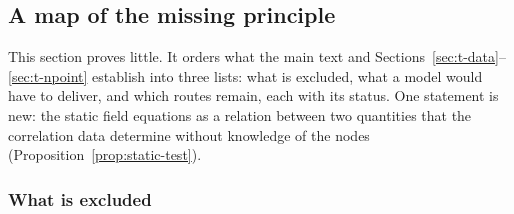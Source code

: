 \documentclass[11pt,a4paper]{article}
\theoremstyle{stmt}
\theoremstyle{defn}
\theoremstyle{rmk}
\numberwithin{equation}{section}
\begin{document}
{\subsection{A map of the missing principle}\label{sec:t-principle}

This section proves little. It orders what the main text and Sections~\ref{sec:t-data}--\ref{sec:t-npoint} establish into three lists: what is excluded, what a model would have to deliver, and which routes remain, each with its status. One statement is new: the static field equations as a relation between two quantities that the correlation data determine without knowledge of the nodes (Proposition~\ref{prop:static-test}).

\subsubsection{What is excluded}

}
\end{document}
